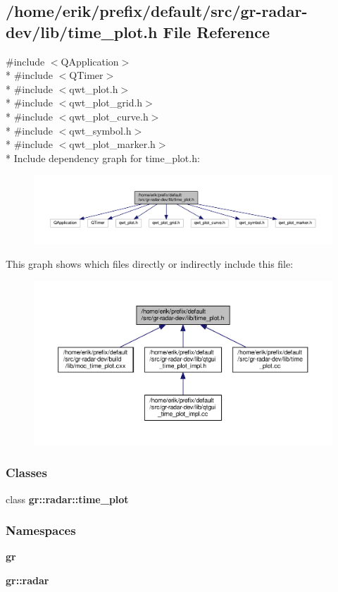 \subsection{/home/erik/prefix/default/src/gr-\/radar-\/dev/lib/time\+\_\+plot.h File Reference}
\label{time__plot_8h}
{\ttfamily \#include $<$Q\+Application$>$}\\*
{\ttfamily \#include $<$Q\+Timer$>$}\\*
{\ttfamily \#include $<$qwt\+\_\+plot.\+h$>$}\\*
{\ttfamily \#include $<$qwt\+\_\+plot\+\_\+grid.\+h$>$}\\*
{\ttfamily \#include $<$qwt\+\_\+plot\+\_\+curve.\+h$>$}\\*
{\ttfamily \#include $<$qwt\+\_\+symbol.\+h$>$}\\*
{\ttfamily \#include $<$qwt\+\_\+plot\+\_\+marker.\+h$>$}\\*
Include dependency graph for time\+\_\+plot.\+h\+:
\nopagebreak
\begin{figure}[H]
\begin{center}
\leavevmode
\includegraphics[width=350pt]{da/d50/time__plot_8h__incl}
\end{center}
\end{figure}
This graph shows which files directly or indirectly include this file\+:
\nopagebreak
\begin{figure}[H]
\begin{center}
\leavevmode
\includegraphics[width=350pt]{d8/da2/time__plot_8h__dep__incl}
\end{center}
\end{figure}
\subsubsection*{Classes}
\begin{DoxyCompactItemize}
\item 
class {\bf gr\+::radar\+::time\+\_\+plot}
\end{DoxyCompactItemize}
\subsubsection*{Namespaces}
\begin{DoxyCompactItemize}
\item 
 {\bf gr}
\item 
 {\bf gr\+::radar}
\end{DoxyCompactItemize}
